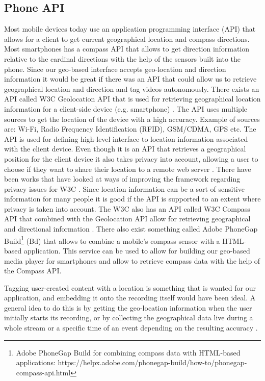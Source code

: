 \subsection{Phone API}
\label{sec:phoneapi}
Most mobile devices today use an application programming interface (API) that allows for a client to get current geographical location and compass directions. Most smartphones has a compass API that allows to get direction information relative to the cardinal directions with the help of the sensors built into the phone. Since our geo-based interface accepts geo-location and direction information it would be great if there was an API that could allow us to retrieve geographical location and direction and tag videos autonomously. There exists an API called W3C Geolocation API that is used for retrieving geographical location information for a client-side device (e.g. smartphone) \cite{geoapi}. The API uses multiple sources to get the location of the device with a high accuracy. Example of sources are: Wi-Fi, Radio Frequency Identification (RFID), GSM/CDMA, GPS etc. The API is used for defining high-level interface to location information associated with the client device. Even though it is an API that retrieves a geographical position for the client device it also takes privacy into account, allowing a user to choose if they want to share their location to a remote web server \cite{usesofgeo}. There have been works that have looked at ways of improving the framework regarding privacy issues for W3C \cite{privacyissues}. Since location information can be a sort of sensitive information for many people it is good if the API is supported to an extent where privacy is taken into account. The W3C also has an API called W3C Compass API that combined with the Geolocation API allow for retrieving geographical and directional information \cite{compassapi}. There also exist something called Adobe PhoneGap Build\footnote{Adobe PhoneGap Build for combining compass data with HTML-based applications: https://helpx.adobe.com/phonegap-build/how-to/phonegap-compass-api.html} (Bd) that allows to combine a mobile’s compass sensor with a HTML-based application. This service can be used to allow for building our geo-based media player for smartphones and allow to retrieve compass data with the help of the Compass API.

Tagging user-created content with a location is something that is wanted for our application, and embedding it onto the recording itself would have been ideal. A general idea to do this is by getting the geo-location information when the user initially starts its recording, or by collecting the geographical data live during a whole stream or a specific time of an event depending on the resulting accuracy \cite{locationstrategies}.

